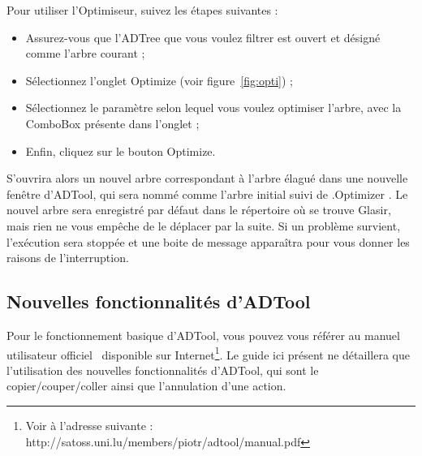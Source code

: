Pour utiliser l'Optimiseur, suivez les étapes suivantes :

\begin{itemize}
\item Assurez-vous que l'ADTree que vous voulez filtrer est ouvert et désigné comme l'arbre courant ;
\item Sélectionnez l'onglet \og Optimize \fg{} (voir {\sc figure}~\ref{fig:opti}) ;
\item Sélectionnez le paramètre selon lequel vous voulez optimiser l'arbre, avec la ComboBox présente dans l'onglet ;
\item Enfin, cliquez sur le bouton \og Optimize\fg{}.
\end{itemize}

S'ouvrira alors un nouvel arbre correspondant à l'arbre élagué dans une nouvelle fenêtre d'ADTool, qui sera nommé comme l'arbre initial suivi de \og .Optimizer \fg{}. Le nouvel arbre sera enregistré par défaut dans le répertoire où se trouve Glasir, mais rien ne vous empêche de le déplacer par la suite.
Si un problème survient, l'exécution sera stoppée et une boite de message apparaîtra pour vous donner les raisons de l'interruption.

\subsection{Nouvelles fonctionnalités d'ADTool}
\label{ssec:manuelADTool}

Pour le fonctionnement basique d'ADTool, vous pouvez vous référer au manuel utilisateur officiel~\cite{ADTool_Manual} disponible sur Internet\footnote{Voir à l'adresse suivante : http://satoss.uni.lu/members/piotr/adtool/manual.pdf}. Le guide ici présent ne détaillera que l'utilisation des nouvelles fonctionnalités d'ADTool, qui sont le copier/couper/coller ainsi que l'annulation d'une action.

